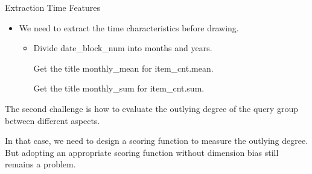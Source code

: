 \documentclass[
 size=14pt,
 paper=smartboard,  %
 mode=present, 		%
 display=slides, 	%
 style=tuliplab,  	%
 pauseslide,
 fleqn,leqno]{powerdot}
\begin{document}
\begin{slide}[toc=,bm=]{Extraction Time Features}

  \begin{itemize}
  \item
  We need to extract the time characteristics before drawing.
  
  \begin{itemize}
  \item
  Divide date_block_num into months and years.
 
  Get the title monthly_mean for item_cnt.mean.

  Get the title monthly_sum for item_cnt.sum.
 
  \end{itemize}
  \end{itemize}
  
  \begin{note}
  The second challenge is how to evaluate the outlying degree of
  the query group between different aspects.
  
  In that case,
  we need to design a scoring function to measure the outlying degree.
  But adopting an appropriate scoring function without dimension bias still remains a problem.
  \end{note}
  
  \end{slide}
\end{document}
